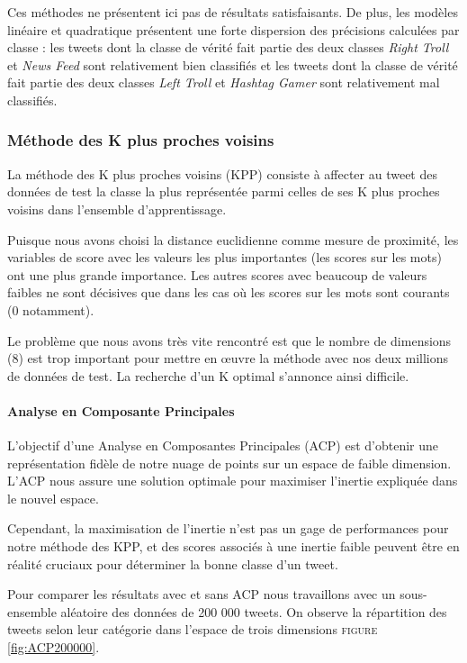 \documentclass[twocolumn,10pt]{article}
\begin{document}
Ces méthodes ne présentent ici pas de résultats satisfaisants. De plus, les modèles linéaire et quadratique présentent une forte dispersion des précisions calculées par classe : les tweets dont la classe de vérité fait partie des deux classes \textit{Right Troll} et \textit{News Feed} sont relativement bien classifiés et les tweets dont la classe de vérité fait partie des deux classes \textit{Left Troll} et \textit{Hashtag Gamer} sont relativement mal classifiés.


\subsubsection{Méthode des K plus proches voisins}

La méthode des K plus proches voisins (KPP) consiste à affecter au tweet des données de test la classe la plus représentée parmi celles de ses K plus proches voisins dans l'ensemble d'apprentissage.

Puisque nous avons choisi la distance euclidienne comme mesure de proximité, les variables de score avec les valeurs les plus importantes (les scores sur les mots) ont une plus grande importance. Les autres scores avec beaucoup de valeurs faibles ne sont décisives que dans les cas où les scores sur les mots sont courants (0 notamment).

Le problème que nous avons très vite rencontré est que le nombre de dimensions (8) est trop important pour mettre en œuvre la méthode avec nos deux millions de données de test. La recherche d'un K optimal s'annonce ainsi difficile.

\paragraph{Analyse en Composante Principales}

L'objectif d'une Analyse en Composantes Principales (ACP) est d'obtenir une représentation fidèle de notre nuage de points sur un espace de faible dimension. L'ACP nous assure une solution optimale pour maximiser l'inertie expliquée dans le nouvel espace.

Cependant, la maximisation de l'inertie n'est pas un gage de performances pour notre méthode des KPP, et des scores associés à une inertie faible peuvent être en réalité cruciaux pour déterminer la bonne classe d'un tweet.

Pour comparer les résultats avec et sans ACP nous travaillons avec un sous-ensemble aléatoire des données de 200 000 tweets. On observe la répartition des tweets selon leur catégorie dans l'espace de trois dimensions \textsc{figure} \ref{fig:ACP200000}.
\end{document}
